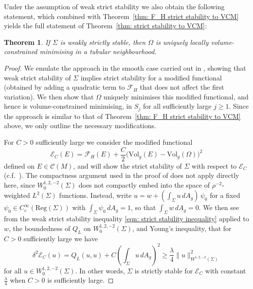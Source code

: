 \documentclass[12pt]{article}
\newtheorem{theorem}{Theorem}
\begin{document}
Under the assumption of weak strict stability we also obtain the following statement, which combined with Theorem~\ref{thm: F_H strict stability to VCM} yields the full statement of Theorem~\ref{thm: strict stability to VCM}:

\begin{theorem}\label{thm: weak strictly stable to VCM}
    If $\Sigma$ is weakly strictly stable, then $\Omega$ is uniquely locally volume-constrained minimising in a tubular neighbourhood.
\end{theorem}

\begin{proof}
We emulate the approach in the smooth case carried out in \cite{G96}, showing that weak strict stability of $\Sigma$ implies strict stability for a modified functional (obtained by adding a quadratic term to $\mathcal{F}_H$ that does not affect the first variation). We then show that $\Omega$ uniquely minimises this modified functional, and hence is volume-constrained minimising, in $S_j$ for all sufficiently large $j \geq 1$. Since the approach is similar to that of Theorem~\ref{thm: F_H strict stability to VCM} above, we only outline the necessary modifications.

\bigskip

For $C > 0$ sufficiently large we consider the modified functional
$$\mathcal{E}_C(E) = \mathcal{F}_H(E) + 
\frac{C}{2}\bigl(\mathrm{Vol}_g(E)-\mathrm{Vol}_g(\Omega)\bigr)^2$$
defined on $E \in \mathcal{C}(M)$, and will show the strict stability of $\Sigma$ with respect to $\mathcal{E}_C$ (c.f.~\cite[Lemma 5]{G96}). The compactness argument used in the proof of \cite[Lemma 5]{G96} does not apply directly here, since $W^{1,2,-2}_0(\Sigma)$ does not compactly embed into the space of $\rho^{-2}$-weighted $L^2(\Sigma)$ functions. Instead, write $u=w+(\int_\Sigma u \, dA_g)\,\psi_0$ for a fixed $\psi_0\in C^\infty_c(\mathrm{Reg}(\Sigma))$ with $\int_\Sigma\psi_0 \, dA_g = 1$, so that $\int_\Sigma w \, dA_g = 0$. We then see from the weak strict stability inequality \eqref{eqn: strict stability inequality} applied to $w$, the boundedness of $Q_L$ on $W^{1,2,-2}_0(\Sigma)$, and Young's inequality, that for $C > 0$ sufficiently large we have
$$
\delta^2 \mathcal{E}_C(u) = Q_L(u,u) + C\left(\int_\Sigma u \, dA_g\right)^2  \geq \frac{\lambda}{4}\|u\|_{W^{1,2,-2}(\Sigma)}^2$$
for all $u\in W^{1,2,-2}_0(\Sigma)$. In other words, $\Sigma$ is strictly stable for $\mathcal{E}_C$ with constant $\frac{\lambda}{4}$ when $C > 0$ is sufficiently large.


\end{proof}
\end{document}
